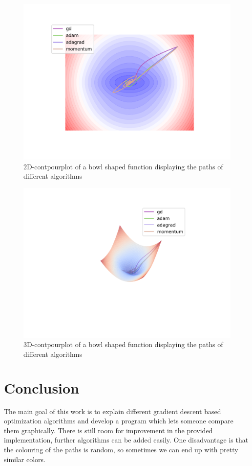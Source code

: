 \documentclass[aodsor,preprint]{imsart}
\numberwithin{equation}{section}
\theoremstyle{plain}
\begin{document}
\begin{figure}[htb]
\centering
\includegraphics[scale=0.7]{images/compare1.png}
\caption{2D-contpourplot of a bowl shaped function displaying the paths of different algorithms}
\label{fig:contour1}
\end{figure}

\begin{figure}[htb]
\centering
\includegraphics[scale=0.7]{images/compare2.png}
\caption{3D-contpourplot of a bowl shaped function displaying the paths of different algorithms}
\label{fig:contour2}
\end{figure}


\section{Conclusion}
The main goal of this work is to explain different gradient descent based optimization algorithms and develop a program which lets someone compare them graphically. There is still room for improvement in the provided implementation, further algorithms can be added easily. One disadvantage is that the colouring of the paths is random, so sometimes we can end up with pretty similar colors.



{}
\end{document}
